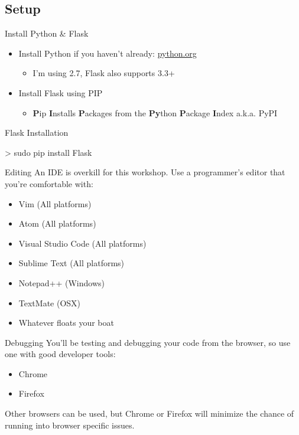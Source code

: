 \documentclass{beamer}
\begin{document}
\subsection{Setup}
	\begin{frame}[t]{Install Python \& Flask}
		\begin{itemize}
			\item{
				Install Python if you haven't already: \url{python.org}
				\begin{itemize}
					\item{I'm using 2.7, Flask also supports 3.3+}
				\end{itemize}
			}
			\item{
				Install Flask using PIP
				\begin{itemize}
					\item{\textbf{P}ip \textbf{I}nstalls \textbf{P}ackages from
						the \textbf{Py}thon \textbf{P}ackage \textbf{I}ndex a.k.a. PyPI}
				\end{itemize}
			}
		\end{itemize}
		\begin{block}{Flask Installation}
		\begin{semiverbatim}
			> sudo pip install Flask
		\end{semiverbatim}
		\end{block}
	\end{frame}


	\begin{frame}[t]{Editing}
		An IDE is overkill for this workshop. Use a programmer's editor that
		you're comfortable with:
		\begin{itemize}
			\item{Vim (All platforms)}
			\item{Atom (All platforms)}
			\item{Visual Studio Code (All platforms)}
			\item{Sublime Text (All platforms)}
			\item{Notepad++ (Windows)}
			\item{TextMate (OSX)}
			\item{Whatever floats your boat}
		\end{itemize}
	\end{frame}


	\begin{frame}[t]{Debugging}
		You'll be testing and debugging your code from the browser, so use one
		with good developer tools:
		\begin{itemize}
			\item{Chrome}
			\item{Firefox}
		\end{itemize}

		Other browsers can be used, but Chrome or Firefox will minimize the
		chance of running into browser specific issues.
	\end{frame}
\end{document}
